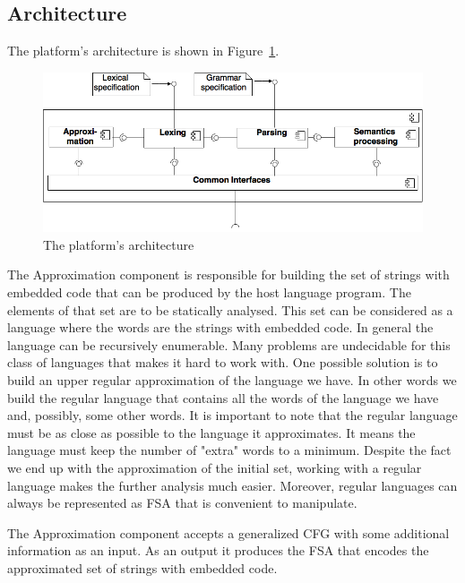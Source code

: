\subsection{Architecture}

The platform's architecture is shown in Figure~\ref{platform_architecture_ref}.

\begin{figure}[h!]
    \begin{center}
        \includegraphics[scale=0.3]{Figures/SELYCcomponents.png}
    \end{center}
    \caption{The platform's architecture}
    \label{platform_architecture_ref}
\end{figure} 

The Approximation component is responsible for building the set of strings with embedded code that can be produced by the host language program. The elements of that set are to be statically analysed. This set can be considered as a language where the words are the strings with embedded code. In general the language can be recursively enumerable. Many problems are undecidable for this class of languages that makes it hard to work with. One possible solution is to build an upper regular approximation of the language we have. In other words we build the regular language that contains all the words of the language we have and, possibly, some other words. It is important to note that the regular language must be as close as possible to the language it approximates. It means the language must keep the number of "extra" words to a minimum. Despite the fact we end up with the approximation of the initial set, working with a regular language makes the further analysis much easier. Moreover, regular languages can always be represented as FSA that is convenient to manipulate.

The Approximation component accepts a generalized CFG with some additional information as an input. As an output it produces the FSA that encodes the approximated set of strings with embedded code.

